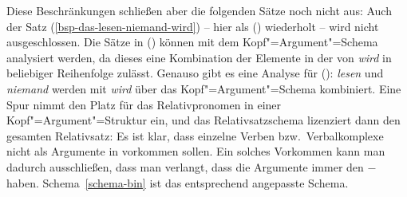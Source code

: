 Diese Beschränkungen schließen aber die folgenden Sätze noch nicht aus:
\eal
{}
\zl
Auch der Satz (\ref{bsp-das-lesen-niemand-wird}) -- hier als () wiederholt --
wird nicht ausgeschlossen.
\z
Die Sätze in () können mit dem Kopf"=Argument"=Schema analysiert werden,
da dieses eine Kombination der Elemente in der \compsl von \emph{wird} in beliebiger
Reihenfolge zulässt. Genauso gibt es eine Analyse für (): \emph{lesen} und \emph{niemand}
werden mit \emph{wird} über das Kopf"=Argument"=Schema kombiniert. Eine Spur nimmt den Platz
für das Relativpronomen in einer Kopf"=Argument"=Struktur ein, und das Relativsatzschema lizenziert
dann den gesamten Relativsatz:
\z
Es ist klar, dass einzelne Verben bzw.\ Verbalkomplexe nicht als Argumente in \kasen
vorkommen sollen. Ein solches Vorkommen kann man dadurch ausschließen, dass man verlangt,
dass die Argumente immer den \lexw $-$ haben. Schema~\ref{schema-bin} ist
das entsprechend angepasste Schema.

\begin{samepage}
\begin{schema}
\label{schema-bin}
 \impl\\
\onems{
      synsem$|$loc$|$cat$|$comps \ibox{1} $\oplus$ \ibox{3}\\
      head-dtr$|$cat$|$comps \ibox{1} $\oplus$ \sliste{ \ibox{2} } $\oplus$ \ibox{3} \\
      non-head-dtrs \sliste{ [ \synsem  \ibox{2} \textrm{[\textsc{lex}  $-$ ]} ] }\\
}
\end{schema}
\end{samepage}

